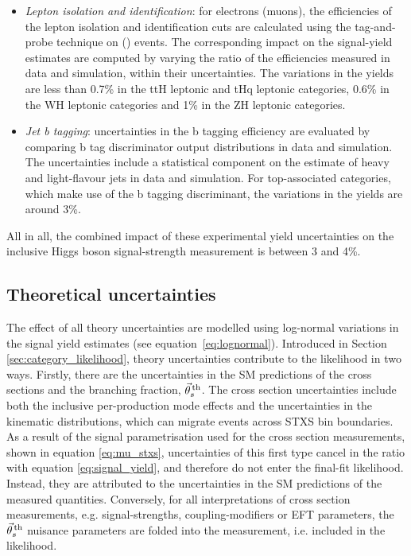 \begin{itemize}
    \item \textit{Lepton isolation and identification}: for electrons (muons), the efficiencies of the lepton isolation and identification cuts are calculated using the tag-and-probe technique on \Zee (\Zmumu) events. The corresponding impact on the signal-yield estimates are computed by varying the ratio of the efficiencies measured in data and simulation, within their uncertainties. The variations in the yields are less than 0.7\% in the ttH leptonic and tHq leptonic categories, 0.6\% in the WH leptonic categories and 1\% in the ZH leptonic categories. 
    
    \item \textit{Jet b tagging}: uncertainties in the b tagging efficiency are evaluated by comparing b tag discriminator output distributions in data and simulation. The uncertainties include a statistical component on the estimate of heavy and light-flavour jets in data and simulation. For top-associated categories, which make use of the b tagging discriminant, the variations in the yields are around 3\%.
\end{itemize}

\noindent
All in all, the combined impact of these experimental yield uncertainties on the inclusive Higgs boson signal-strength measurement is between 3 and 4\%.

\subsection{Theoretical uncertainties}\label{sec:systematics_theoretical}
The effect of all theory uncertainties are modelled using log-normal variations in the signal yield estimates (see equation~\ref{eq:lognormal}). Introduced in Section \ref{sec:category_likelihood}, theory uncertainties contribute to the likelihood in two ways. Firstly, there are the uncertainties in the SM predictions of the cross sections and the \hgg branching fraction, $\vec{\theta}^{\,\rm{th}}_{s}$. The cross section uncertainties include both the inclusive per-production mode effects and the uncertainties in the kinematic distributions, which can migrate events across STXS bin boundaries. As a result of the signal parametrisation used for the cross section measurements, shown in equation \ref{eq:mu_stxs}, uncertainties of this first type cancel in the ratio with equation \ref{eq:signal_yield}, and therefore do not enter the final-fit likelihood. Instead, they are attributed to the uncertainties in the SM predictions of the measured quantities. Conversely, for all interpretations of cross section measurements, e.g. signal-strengths, coupling-modifiers or EFT parameters, the $\vec{\theta}^{\,\rm{th}}_{s}$ nuisance parameters are folded into the measurement, i.e. included in the likelihood.

